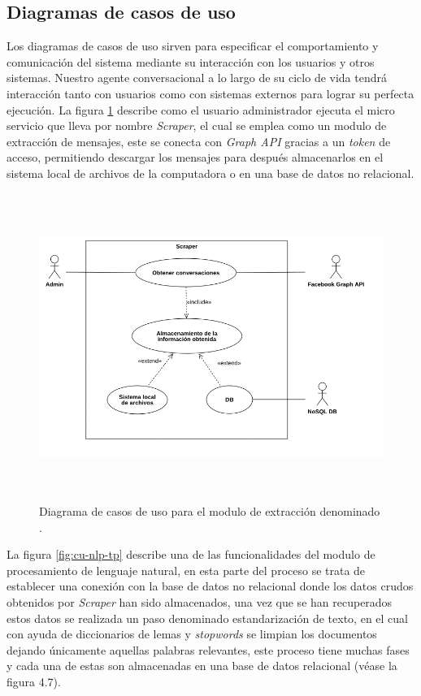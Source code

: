    \subsection{Diagramas de casos de uso}
        Los diagramas de casos de uso sirven para especificar el comportamiento y comunicación del sistema mediante su interacción con los usuarios y otros sistemas. Nuestro agente conversacional a lo largo de su ciclo de vida tendrá interacción tanto con usuarios como con sistemas externos para lograr su perfecta ejecución. La figura \ref{fig:cu-scraper} describe como el usuario administrador ejecuta el micro servicio que lleva por nombre \textit{Scraper}, el cual se emplea como un modulo de extracción de mensajes, este se conecta con \textit{Graph API} gracias a un \textit{token} de acceso, permitiendo descargar los mensajes para después almacenarlos en el sistema local de archivos de la computadora o en una base de datos no relacional.
        \begin{figure}[H]
             \centering
             \includegraphics[height=10cm, width=16.5cm]{Latex/Classes/Imagenes/Scraper_cu.png}
             \caption{Diagrama de casos de uso para el modulo de extracción denominado .}
             \label{fig:cu-scraper}
        \end{figure}
        La figura \ref{fig:cu-nlp-tp} describe una de las funcionalidades del modulo de procesamiento de lenguaje natural, en esta parte del proceso se trata de establecer una conexión con la base de datos no relacional donde los datos crudos obtenidos por \textit{Scraper} han sido almacenados, una vez que se han recuperados estos datos se realizada un paso denominado estandarización de texto, en el cual con ayuda de diccionarios de lemas y \textit{stopwords} se limpian los documentos dejando únicamente aquellas palabras relevantes, este proceso tiene muchas fases y cada una de estas son almacenadas en una base de datos relacional (véase la figura 4.7).
